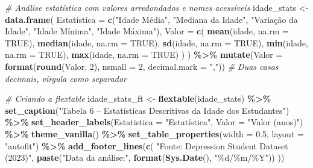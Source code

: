 \documentclass[
]{article}
\newenvironment{Shaded}{\begin{snugshade}}{\end{snugshade}}
\newcommand{\AttributeTok}[1]{\textcolor[rgb]{0.13,0.29,0.53}{#1}}
\newcommand{\CommentTok}[1]{\textcolor[rgb]{0.56,0.35,0.01}{\textit{#1}}}
\newcommand{\ConstantTok}[1]{\textcolor[rgb]{0.56,0.35,0.01}{#1}}
\newcommand{\DecValTok}[1]{\textcolor[rgb]{0.00,0.00,0.81}{#1}}
\newcommand{\FloatTok}[1]{\textcolor[rgb]{0.00,0.00,0.81}{#1}}
\newcommand{\FunctionTok}[1]{\textcolor[rgb]{0.13,0.29,0.53}{\textbf{#1}}}
\newcommand{\NormalTok}[1]{#1}
\newcommand{\OtherTok}[1]{\textcolor[rgb]{0.56,0.35,0.01}{#1}}
\newcommand{\SpecialCharTok}[1]{\textcolor[rgb]{0.81,0.36,0.00}{\textbf{#1}}}
\newcommand{\StringTok}[1]{\textcolor[rgb]{0.31,0.60,0.02}{#1}}
\begin{document}
\begin{Shaded}
\begin{Highlighting}[]
\CommentTok{\# Análise estatística com valores arredondados e nomes acessíveis}
\NormalTok{idade\_stats }\OtherTok{\textless{}{-}} \FunctionTok{data.frame}\NormalTok{(}
  \AttributeTok{Estatistica =} \FunctionTok{c}\NormalTok{(}\StringTok{"Idade Média"}\NormalTok{, }\StringTok{"Mediana da Idade"}\NormalTok{, }\StringTok{"Variação da Idade"}\NormalTok{, }\StringTok{"Idade Mínima"}\NormalTok{, }\StringTok{"Idade Máxima"}\NormalTok{),}
  \AttributeTok{Valor =} \FunctionTok{c}\NormalTok{(}
    \FunctionTok{mean}\NormalTok{(idade, }\AttributeTok{na.rm =} \ConstantTok{TRUE}\NormalTok{),}
    \FunctionTok{median}\NormalTok{(idade, }\AttributeTok{na.rm =} \ConstantTok{TRUE}\NormalTok{),}
    \FunctionTok{sd}\NormalTok{(idade, }\AttributeTok{na.rm =} \ConstantTok{TRUE}\NormalTok{),}
    \FunctionTok{min}\NormalTok{(idade, }\AttributeTok{na.rm =} \ConstantTok{TRUE}\NormalTok{),}
    \FunctionTok{max}\NormalTok{(idade, }\AttributeTok{na.rm =} \ConstantTok{TRUE}\NormalTok{)}
\NormalTok{  )}
\NormalTok{) }\SpecialCharTok{\%\textgreater{}\%}
  \FunctionTok{mutate}\NormalTok{(}\AttributeTok{Valor =} \FunctionTok{format}\NormalTok{(}\FunctionTok{round}\NormalTok{(Valor, }\DecValTok{2}\NormalTok{), }\AttributeTok{nsmall =} \DecValTok{2}\NormalTok{, }\AttributeTok{decimal.mark =} \StringTok{","}\NormalTok{))  }\CommentTok{\# Duas casas decimais, vírgula como separador}

\CommentTok{\# Criando a flextable}
\NormalTok{idade\_stats\_ft }\OtherTok{\textless{}{-}} \FunctionTok{flextable}\NormalTok{(idade\_stats) }\SpecialCharTok{\%\textgreater{}\%}
  \FunctionTok{set\_caption}\NormalTok{(}\StringTok{"Tabela 6 – Estatísticas Descritivas da Idade dos Estudantes"}\NormalTok{) }\SpecialCharTok{\%\textgreater{}\%}
  \FunctionTok{set\_header\_labels}\NormalTok{(}\AttributeTok{Estatistica =} \StringTok{"Estatística"}\NormalTok{, }\AttributeTok{Valor =} \StringTok{"Valor (anos)"}\NormalTok{) }\SpecialCharTok{\%\textgreater{}\%}
  \FunctionTok{theme\_vanilla}\NormalTok{() }\SpecialCharTok{\%\textgreater{}\%}
  \FunctionTok{set\_table\_properties}\NormalTok{(}\AttributeTok{width =} \FloatTok{0.5}\NormalTok{, }\AttributeTok{layout =} \StringTok{"autofit"}\NormalTok{) }\SpecialCharTok{\%\textgreater{}\%}
  \FunctionTok{add\_footer\_lines}\NormalTok{(}\FunctionTok{c}\NormalTok{(}
    \StringTok{"Fonte: Depression Student Dataset (2023)"}\NormalTok{, }
    \FunctionTok{paste}\NormalTok{(}\StringTok{"Data da análise:"}\NormalTok{, }\FunctionTok{format}\NormalTok{(}\FunctionTok{Sys.Date}\NormalTok{(), }\StringTok{"\%d/\%m/\%Y"}\NormalTok{))}
\NormalTok{  ))}


\end{Highlighting}
\end{Shaded}
\end{document}
